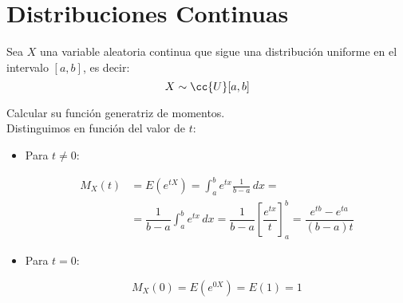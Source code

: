 \newpage
\section{Distribuciones Continuas}

\begin{ejercicio}
    Sea $X$ una variable aleatoria continua que sigue una distribución uniforme en el intervalo $[a,b]$, es decir:
    \begin{equation*}
        X\sim \cc{U}[a,b]
    \end{equation*}

    \noindent
    Calcular su función generatriz de momentos.\\

    Distinguimos en función del valor de $t$:
    \begin{itemize}
        \item Para $t\neq 0$:

        \begin{align*}
            M_X(t) &= E\left(e^{tX}\right) = \int_{a}^{b} e^{tx} \frac{1}{b-a} \, dx =\\
            &= \dfrac{1}{b-a} \int_{a}^{b} e^{tx} \, dx = \dfrac{1}{b-a} \left[ \dfrac{e^{tx}}{t} \right]_{a}^{b} =
            \dfrac{e^{tb} - e^{ta}}{(b-a)t}
        \end{align*}

        \item Para $t=0$:
        
        \begin{equation*}
            M_X(0) = E\left(e^{0X}\right) = E(1) = 1
        \end{equation*}
    \end{itemize}
\end{ejercicio}


